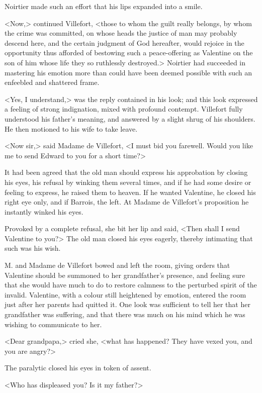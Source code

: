 Noirtier made such an effort that his lips expanded into a smile. 

 <Now,> continued Villefort, <those to whom the guilt really belongs, by whom the crime was committed, on whose heads the justice of man may probably descend here, and the certain judgment of God hereafter, would rejoice in the opportunity thus afforded of bestowing such a peace-offering as Valentine on the son of him whose life they so ruthlessly destroyed.> Noirtier had succeeded in mastering his emotion more than could have been deemed possible with such an enfeebled and shattered frame. 

 <Yes, I understand,> was the reply contained in his look; and this look expressed a feeling of strong indignation, mixed with profound contempt. Villefort fully understood his father's meaning, and answered by a slight shrug of his shoulders. He then motioned to his wife to take leave. 

 <Now sir,> said Madame de Villefort, <I must bid you farewell. Would you like me to send Edward to you for a short time?> 

 It had been agreed that the old man should express his approbation by closing his eyes, his refusal by winking them several times, and if he had some desire or feeling to express, he raised them to heaven. If he wanted Valentine, he closed his right eye only, and if Barrois, the left. At Madame de Villefort's proposition he instantly winked his eyes. 

 Provoked by a complete refusal, she bit her lip and said, <Then shall I send Valentine to you?> The old man closed his eyes eagerly, thereby intimating that such was his wish. 

 M. and Madame de Villefort bowed and left the room, giving orders that Valentine should be summoned to her grandfather's presence, and feeling sure that she would have much to do to restore calmness to the perturbed spirit of the invalid. Valentine, with a colour still heightened by emotion, entered the room just after her parents had quitted it. One look was sufficient to tell her that her grandfather was suffering, and that there was much on his mind which he was wishing to communicate to her. 

 <Dear grandpapa,> cried she, <what has happened? They have vexed you, and you are angry?> 

 The paralytic closed his eyes in token of assent. 

 <Who has displeased you? Is it my father?> 

